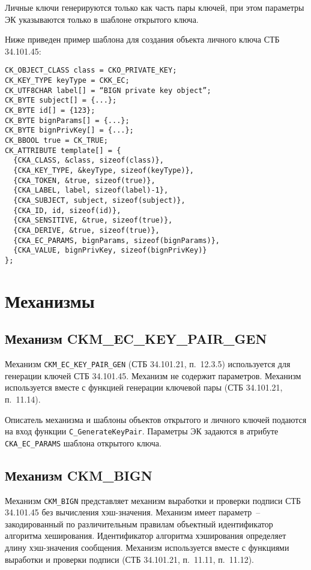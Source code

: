 Личные ключи генерируются только как часть пары ключей,
при этом параметры ЭК указываются только в шаблоне
открытого ключа.

Ниже приведен пример шаблона для создания объекта личного ключа СТБ 34.101.45:
\begin{verbatim}
CK_OBJECT_CLASS class = CKO_PRIVATE_KEY;
CK_KEY_TYPE keyType = CKK_EC;
CK_UTF8CHAR label[] = “BIGN private key object”;
CK_BYTE subject[] = {...};
CK_BYTE id[] = {123};
CK_BYTE bignParams[] = {...};
CK_BYTE bignPrivKey[] = {...};
CK_BBOOL true = CK_TRUE;
CK_ATTRIBUTE template[] = {
  {CKA_CLASS, &class, sizeof(class)},
  {CKA_KEY_TYPE, &keyType, sizeof(keyType)},
  {CKA_TOKEN, &true, sizeof(true)},
  {CKA_LABEL, label, sizeof(label)-1},
  {CKA_SUBJECT, subject, sizeof(subject)},
  {CKA_ID, id, sizeof(id)},
  {CKA_SENSITIVE, &true, sizeof(true)},
  {CKA_DERIVE, &true, sizeof(true)},
  {CKA_EC_PARAMS, bignParams, sizeof(bignParams)},
  {CKA_VALUE, bignPrivKey, sizeof(bignPrivKey)}
};
\end{verbatim}

\section{Механизмы}

\subsection{Механизм CKM\_EC\_KEY\_PAIR\_GEN}
Механизм \verb|CKM_EC_KEY_PAIR_GEN| (СТБ 34.101.21, п.~12.3.5)
используется для генерации ключей СТБ 34.101.45.
Механизм не содержит параметров.
Механизм используется вместе с функцией генерации ключевой
пары (СТБ 34.101.21, п.~11.14).

Описатель механизма и шаблоны объектов открытого и личного
ключей подаются на вход функции \verb|C_GenerateKeyPair|.
Параметры ЭК задаются в атрибуте \verb|CKA_EC_PARAMS|
шаблона открытого ключа.

\subsection{Механизм CKM\_BIGN}

Механизм
\verb|CKM_BIGN| представляет механизм выработки и проверки
подписи СТБ 34.101.45 без вычисления хэш-значения.
Механизм имеет параметр~-- закодированный по различительным
правилам объектный идентификатор алгоритма хеширования. 
Идентификатор алгоритма хэширования определяет длину
хэш-значения сообщения.
Механизм используется вместе с функциями выработки и
проверки подписи (СТБ 34.101.21, п.~11.11, п.~11.12).

